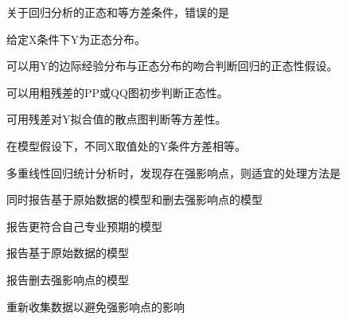 \par\addvspace{6pt}\noindent\begin{minipage}{\linewidth}


关于回归分析的正态和等方差条件，错误的是


\begin{choices}

\item 给定X条件下Y为正态分布。

\item 可以用Y的边际经验分布与正态分布的吻合判断回归的正态性假设。

\item 可以用粗残差的PP或QQ图初步判断正态性。

\item 可用残差对Y拟合值的散点图判断等方差性。

\item 在模型假设下，不同X取值处的Y条件方差相等。

\end{choices}

\end{minipage}\par\vspace{4pt}

\par\addvspace{6pt}\noindent\begin{minipage}{\linewidth}


多重线性回归统计分析时，发现存在强影响点，则适宜的处理方法是


\begin{choices}

\item 同时报告基于原始数据的模型和删去强影响点的模型

\item 报告更符合自己专业预期的模型

\item 报告基于原始数据的模型

\item 报告删去强影响点的模型

\item 重新收集数据以避免强影响点的影响

\end{choices}

\end{minipage}\par\vspace{4pt}

